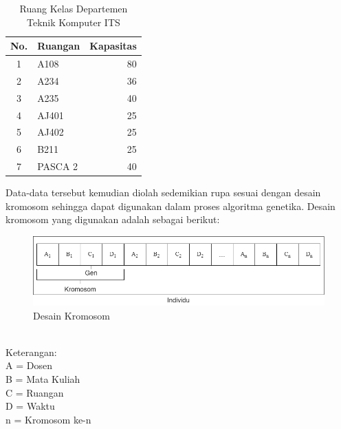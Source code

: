 \begin{longtable}{|c|l|r|}
  \caption{Ruang Kelas Departemen Teknik Komputer ITS}
  \label{tb:ruang}\\
  \hline
  \rowcolor[HTML]{D0CECE} 
  No. & Ruangan & Kapasitas \\ \hline
  1   & A108                                                 & 80                                                     \\ 
  2   & A234                                                 & 36                                                     \\ 
  3   & A235                                                 & 40                                                     \\ 
  4   & AJ401                                                & 25                                                     \\ 
  5   & AJ402                                                & 25                                                     \\ 
  6   & B211                                                 & 25                                                     \\ 
  7   & PASCA 2                                              & 40                                                     \\ 
  \hline
\end{longtable}
  Data-data tersebut kemudian diolah sedemikian rupa sesuai dengan desain kromosom \linebreak sehingga dapat digunakan dalam proses algoritma genetika. Desain kromosom yang digunakan adalah sebagai berikut:
\begin{figure} [ht] \centering
    \includegraphics[scale=0.5]{gambar/kromosom.png}
    \caption{Desain Kromosom}
    \label{fig:kromosom}
\end{figure}\\
  Keterangan:\\
  A = Dosen\\
  B = Mata Kuliah\\
  C = Ruangan\\
  D = Waktu\\
  n = Kromosom ke-n

